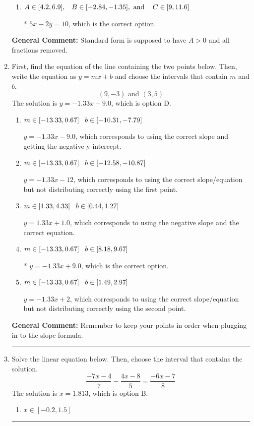 \documentclass{extbook}[14pt]
\newcommand{\litem}[1]{\item #1

\rule{\textwidth}{0.4pt}}
\begin{document}
\begin{enumerate}
{\begin{enumerate}[label=\Alph*.]
 $5x + 2y = -10$, which corresponds to using the opposite (negative) slope of the graph, but did everything else correctly.
\item \( A \in [4.2, 6.9], \hspace{3mm} B \in [-2.84, -1.35], \text{ and } \hspace{3mm} C \in [9, 11.6] \)

* $5x - 2y = 10$, which is the correct option.
\end{enumerate}

\textbf{General Comment:} Standard form is supposed to have $A > 0$ and all fractions removed.
}
\litem{
First, find the equation of the line containing the two points below. Then, write the equation as $ y=mx+b $ and choose the intervals that contain $m$ and $b$.
\[ (9, -3) \text{ and } (3, 5) \]The solution is \( y = -1.33x + 9.0 \), which is option D.\begin{enumerate}[label=\Alph*.]
\item \( m \in [-13.33, 0.67] \hspace*{3mm} b \in [-10.31, -7.79] \)

 $y = -1.33x -9.0$, which corresponds to using the correct slope and getting the negative y-intercept.
\item \( m \in [-13.33, 0.67] \hspace*{3mm} b \in [-12.58, -10.87] \)

 $y = -1.33x -12$, which corresponds to using the correct slope/equation but not distributing correctly using the first point.
\item \( m \in [1.33, 4.33] \hspace*{3mm} b \in [0.44, 1.27] \)

 $y = 1.33x + 1.0$, which corresponds to using the negative slope and the correct equation.
\item \( m \in [-13.33, 0.67] \hspace*{3mm} b \in [8.18, 9.67] \)

* $y = -1.33x + 9.0$, which is the correct option.
\item \( m \in [-13.33, 0.67] \hspace*{3mm} b \in [1.49, 2.97] \)

 $y = -1.33x + 2$, which corresponds to using the correct slope/equation but not distributing correctly using the second point.
\end{enumerate}

\textbf{General Comment:} Remember to keep your points in order when plugging in to the slope formula.
}
\litem{
Solve the linear equation below. Then, choose the interval that contains the solution.
\[ \frac{-7x -4}{7} - \frac{4x -8}{5} = \frac{-6x -7}{8} \]The solution is \( x = 1.813 \), which is option B.\begin{enumerate}[label=\Alph*.]
\item \( x \in [-0.2, 1.5] \)


\end{enumerate}}
\end{enumerate}
\end{document}
